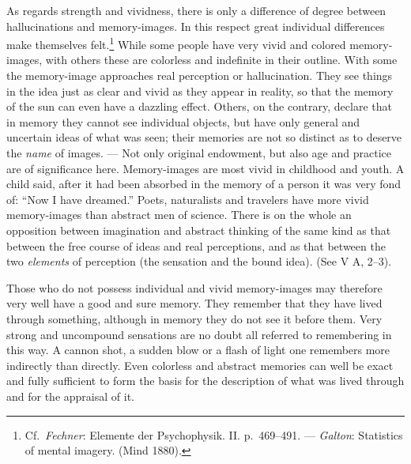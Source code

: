 \documentclass[12pt,a4paper]{book}
\newcommand{\opage}[1]{\marginnote{\footnotesize\textit{[#1]}}}
\begin{document}
As regards strength and vividness, there is only a difference of degree
between hallucinations and memory-images. In this respect great individual
differences make themselves felt.\footnote{Cf.\ \emph{Fechner}: Elemente
der Psychophysik. II. p.~469--491. --- \emph{Galton}: Statistics of mental
imagery. (Mind 1880).} While some people have very vivid and colored
memory-images, with others these are colorless and indefinite in their
outline. With some the memory-image approaches real perception or
hallucination. They see things in the idea just as clear and vivid as
they appear in reality, so that the memory of the sun can even have a
dazzling effect. Others, on the contrary, declare that in memory they
cannot see individual objects, but have only general and uncertain ideas
of what was seen; their memories are not so distinct as to deserve the
\emph{name} of images. --- Not only original endowment, but also age and
practice are of significance here. Memory-images are most vivid in
childhood and youth. A child said, after it had been absorbed in the
memory of a person it was very fond of: ``Now I have dreamed.'' Poets,
naturalists and travelers have more vivid memory-images than abstract men
of science. There is on the whole an opposition between imagination and
abstract thinking of the same kind as that between the free course of
ideas and real perceptions, and as that between the two \emph{elements} of
perception (the sensation and the bound idea). (See V A, 2--3).


\opage{179}Those who do not possess individual and vivid memory-images may
therefore very well have a good and sure memory. They remember that they
have lived through something, although in memory they do not see it before
them. Very strong and uncompound sensations are no doubt all referred to
remembering in this way. A cannon shot, a sudden blow or a flash of light
one remembers more indirectly than directly. Even colorless and abstract
memories can well be exact and fully sufficient to form the basis for the
description of what was lived through and for the appraisal of it.
\end{document}
